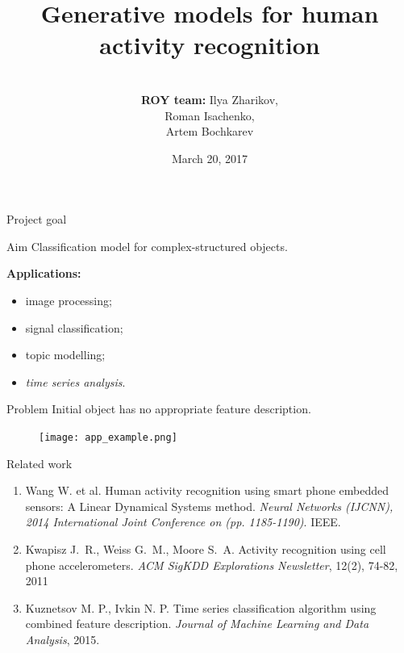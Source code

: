 \documentclass{beamer}
\title[\hbox to 56mm{Human Activity Recognition  \hfill\insertframenumber\,/\,\inserttotalframenumber}]
{Generative models for human activity recognition}
\author[ROY team]{\\
	{\small \textbf{ROY team:} Ilya Zharikov, \\ \hspace{2.67cm}Roman Isachenko, \\ \hspace{2.61cm}Artem Bochkarev}}
\institute[SkolTech]{Skolkovo Institute of Science and Technology \\
	Machine Learning course 
	\vspace{0.3cm}
}
\date{March 20, 2017}
\begin{document}
	\begin{frame}
		\titlepage
	\end{frame}
\begin{frame}{Project goal}
		
		\begin{minipage}[t]{0.45\columnwidth}
			\begin{block}{Aim}
				Classification model for complex-structured objects.
			\end{block}
			
			\vspace{1.5cm}
			
			\textbf{Applications:}
			\begin{itemize}
				\item image processing;
				\item signal classification;
				\item topic modelling;
				\item \textit{time series analysis}.
			\end{itemize}
		\end{minipage}
		\hfill
		\begin{minipage}[t]{0.45\columnwidth}
			\begin{block}{Problem}
				Initial object has no appropriate feature description.
			\end{block}
			\begin{figure}[h]
				\centering
				\texttt{[image: app\_example.png]}
			\end{figure}
		\end{minipage}
		
\end{frame}
\begin{frame}{Related work}
	\begin{enumerate}
		\item Wang W. et al. Human activity recognition using smart phone embedded sensors: A Linear Dynamical Systems method. \emph{Neural Networks (IJCNN), 2014 International Joint Conference on (pp. 1185-1190)}. IEEE.
		\vspace{\baselineskip}
		\item Kwapisz J.~R., Weiss G.~M., Moore S.~A. Activity recognition using cell phone accelerometers. \emph{ACM SigKDD Explorations Newsletter}, 12(2), 74-82, 2011
		\vspace{\baselineskip}
		\item Kuznetsov M. P., Ivkin N. P. Time series classification algorithm using combined feature description. \emph{Journal of Machine Learning and Data Analysis}, 2015.
	\end{enumerate}
	
\end{frame}
\end{document}
